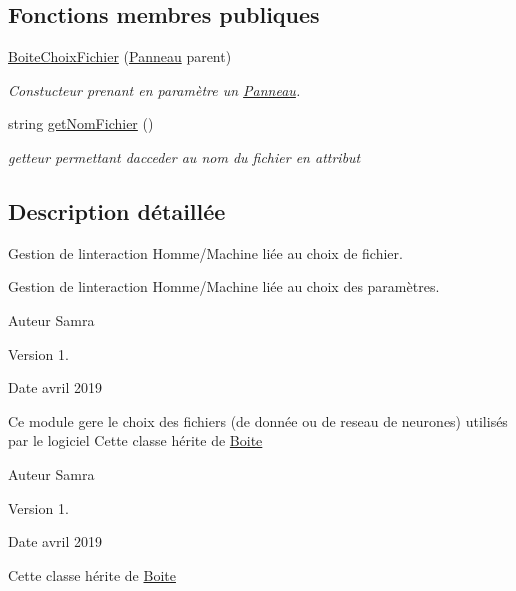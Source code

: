 \subsection*{Fonctions membres publiques}
\begin{DoxyCompactItemize}
\item 
\hyperlink{classBoiteChoixFichier_a083c181fc64db190094be5bc3803e52b}{Boite\+Choix\+Fichier} (\hyperlink{classPanneau}{Panneau} parent)
\begin{DoxyCompactList}\small\item\em Constucteur prenant en paramètre un \hyperlink{classPanneau}{Panneau}. \end{DoxyCompactList}\item 
string \hyperlink{classBoiteChoixFichier_a0e051fe462c74d12ecea8a1c3bd7fad5}{get\+Nom\+Fichier} ()
\begin{DoxyCompactList}\small\item\em getteur permettant d\textquotesingle{}acceder au nom du fichier en attribut \end{DoxyCompactList}\end{DoxyCompactItemize}


\subsection{Description détaillée}
Gestion de l\textquotesingle{}interaction Homme/\+Machine liée au choix de fichier. 

Gestion de l\textquotesingle{}interaction Homme/\+Machine liée au choix des paramètres.

\begin{DoxyAuthor}{Auteur}
Samra 
\end{DoxyAuthor}
\begin{DoxyVersion}{Version}
1. 
\end{DoxyVersion}
\begin{DoxyDate}{Date}
avril 2019
\end{DoxyDate}
Ce module gere le choix des fichiers (de donnée ou de reseau de neurones) utilisés par le logiciel Cette classe hérite de \hyperlink{classBoite}{Boite}

\begin{DoxyAuthor}{Auteur}
Samra 
\end{DoxyAuthor}
\begin{DoxyVersion}{Version}
1. 
\end{DoxyVersion}
\begin{DoxyDate}{Date}
avril 2019
\end{DoxyDate}
Cette classe hérite de \hyperlink{classBoite}{Boite} 

